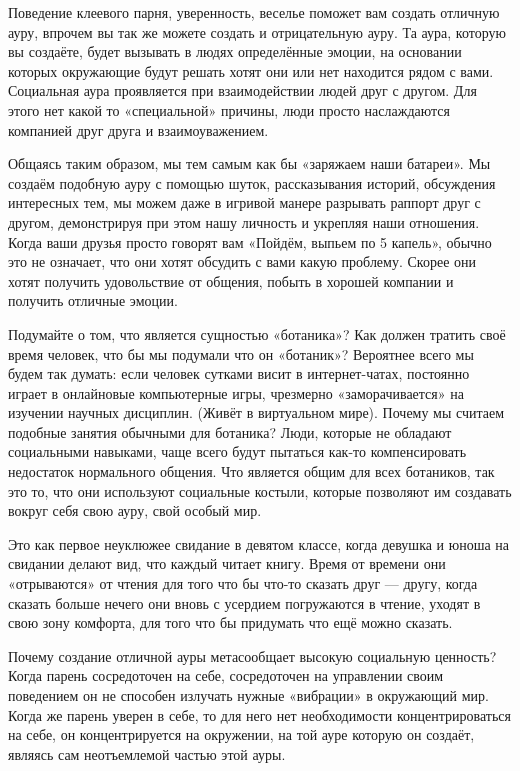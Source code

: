 Поведение клеевого парня, уверенность, веселье поможет вам создать отличную ауру, впрочем вы так же можете создать и отрицательную ауру. Та аура, которую вы создаёте, будет вызывать в людях определённые эмоции, на основании которых окружающие будут решать хотят они или нет находится рядом с вами. Социальная аура проявляется при взаимодействии людей друг с другом. Для этого нет какой то «специальной» причины, люди просто наслаждаются компанией друг друга и взаимоуважением.

Общаясь таким образом, мы тем самым как бы «заряжаем наши батареи». Мы создаём подобную ауру с помощью шуток, рассказывания историй, обсуждения интересных тем, мы можем даже в игривой манере разрывать раппорт друг с другом, демонстрируя при этом нашу личность и укрепляя наши отношения. Когда ваши друзья просто говорят вам «Пойдём, выпьем по 5 капель», обычно это не означает, что они хотят обсудить с вами какую проблему. Скорее они хотят получить удовольствие от общения, побыть в хорошей компании и получить отличные эмоции.

Подумайте о том, что является сущностью «ботаника»? Как должен тратить своё время человек, что бы мы подумали что он «ботаник»? Вероятнее всего мы будем так думать: если человек сутками висит в интернет-чатах, постоянно играет в онлайновые компьютерные игры, чрезмерно «заморачивается» на изучении научных дисциплин. (Живёт в виртуальном мире). Почему мы считаем подобные занятия обычными для ботаника? Люди, которые не обладают социальными навыками, чаще всего будут пытаться как-то компенсировать недостаток нормального общения. Что является общим для всех ботаников, так это то, что они используют социальные костыли, которые позволяют им создавать вокруг себя свою ауру, свой особый мир.

Это как первое неуклюжее свидание в девятом классе, когда девушка и юноша на свидании делают вид, что каждый читает книгу. Время от времени они «отрываются» от чтения для того что бы что-то сказать друг --- другу, когда сказать больше нечего они вновь с усердием погружаются в чтение, уходят в свою зону комфорта, для того что бы придумать что ещё можно сказать.

Почему создание отличной ауры метасообщает высокую социальную ценность? Когда парень сосредоточен на себе, сосредоточен на управлении своим поведением он не способен излучать нужные «вибрации» в окружающий мир. Когда же парень уверен в себе, то для него нет необходимости концентрироваться на себе, он концентрируется на окружении, на той ауре которую он создаёт, являясь сам неотъемлемой частью этой ауры.

